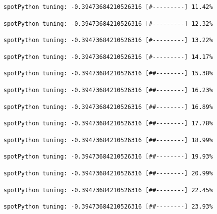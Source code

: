 \documentclass[
  letterpaper,
  DIV=11,
  numbers=noendperiod]{scrreprt}
\begin{document}
\begin{verbatim}
spotPython tuning: -0.39473684210526316 [#---------] 11.42% 
\end{verbatim}

\begin{verbatim}
spotPython tuning: -0.39473684210526316 [#---------] 12.32% 
\end{verbatim}

\begin{verbatim}
spotPython tuning: -0.39473684210526316 [#---------] 13.22% 
\end{verbatim}

\begin{verbatim}
spotPython tuning: -0.39473684210526316 [#---------] 14.17% 
\end{verbatim}

\begin{verbatim}
spotPython tuning: -0.39473684210526316 [##--------] 15.38% 
\end{verbatim}

\begin{verbatim}
spotPython tuning: -0.39473684210526316 [##--------] 16.23% 
\end{verbatim}

\begin{verbatim}
spotPython tuning: -0.39473684210526316 [##--------] 16.89% 
\end{verbatim}

\begin{verbatim}
spotPython tuning: -0.39473684210526316 [##--------] 17.78% 
\end{verbatim}

\begin{verbatim}
spotPython tuning: -0.39473684210526316 [##--------] 18.99% 
\end{verbatim}

\begin{verbatim}
spotPython tuning: -0.39473684210526316 [##--------] 19.93% 
\end{verbatim}

\begin{verbatim}
spotPython tuning: -0.39473684210526316 [##--------] 20.99% 
\end{verbatim}

\begin{verbatim}
spotPython tuning: -0.39473684210526316 [##--------] 22.45% 
\end{verbatim}

\begin{verbatim}
spotPython tuning: -0.39473684210526316 [##--------] 23.93% 
\end{verbatim}
\end{document}
